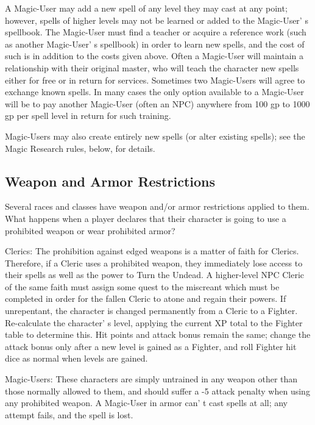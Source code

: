 \documentclass[a4paper,twoside,openany,10pt]{book}
\begin{document}
\begin{multicols}{2}
A Magic-User may add a new spell of any level they may cast at any point; however, spells of higher levels may not be learned or added to the Magic-User' s spellbook. The Magic-User must find a teacher or acquire a reference work (such as another Magic-User' s spellbook) in order to learn new spells, and the cost of such is in addition to the costs given above. Often a Magic-User will maintain a relationship with their original master, who will teach the character new spells either for free or in return for services. Sometimes two Magic-Users will agree to exchange known spells. In many cases the only option available to a Magic-User will be to pay another Magic-User (often an NPC) anywhere from 100 gp to 1000 gp per spell level in return for such training.

Magic-Users may also create entirely new spells (or alter existing spells); see the Magic Research rules, below, for details.

\subsection{Weapon and Armor Restrictions}\label{weapon-and-armor-restrictions}

Several races and classes have weapon and/or armor restrictions applied to them. What happens when a player declares that their character is going to use a prohibited weapon or wear prohibited armor?

Clerics: The prohibition against edged weapons is a matter of faith for Clerics. Therefore, if a Cleric uses a prohibited weapon, they immediately lose access to their spells as well as the power to Turn the Undead. A higher-level NPC Cleric of the same faith must assign some quest to the miscreant which must be completed in order for the fallen Cleric to atone and regain their powers. If unrepentant, the character is changed permanently from a Cleric to a Fighter. Re-calculate the character' s level, applying the current XP total to the Fighter table to determine this. Hit points and attack bonus remain the same; change the attack bonus only after a new level is gained as a Fighter, and roll Fighter hit dice as normal when levels are gained.

Magic-Users: These characters are simply untrained in any weapon other than those normally allowed to them, and should suffer a -5 attack penalty when using any prohibited weapon. A Magic-User in armor can' t cast spells at all; any attempt fails, and the spell is lost.


\end{multicols}
\end{document}
